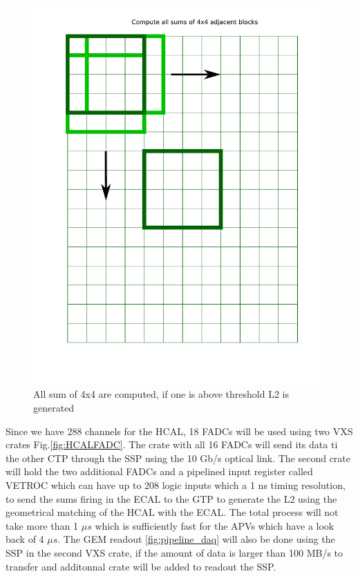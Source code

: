 \documentclass{article}
\begin{document}
\begin{figure}
  \centering
 \includegraphics[width=\textwidth]{figs/HCALSum.pdf}
  \caption{All sum of 4x4 are computed, if one is above threshold L2 is generated }
\label{fig:HCALSum}
\end{figure}

Since we have 288 channels for the HCAL, 18 FADCs will be used using two VXS crates Fig.\ref{fig:HCALFADC}. The crate with all 16 FADCs will send its data ti the other CTP through the SSP using the 10 Gb/s optical link. The second crate will hold the two additional FADCs and a pipelined input register called VETROC which can have up to 208 logic inputs which a 1 ns timing resolution, to send the sums firing in the ECAL to the GTP to generate the L2 using the geometrical matching of the HCAL with the ECAL. The total process will not take more than 1 $\mu s$ which is sufficiently fast for the APVs which have a look back of 4 $\mu s$. The GEM readout \ref{fig:pipeline_daq} will also be done using the SSP in the second VXS crate, if the amount of data is larger than 100 MB/s to transfer and additonnal crate will be added to readout the SSP.
\end{document}

